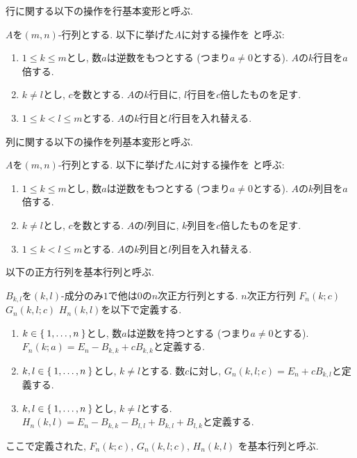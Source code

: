 行に関する以下の操作を行基本変形と呼ぶ.
\begin{definition}
  \label{def:mat:fundtransformation}
  $A$を$(m,n)$-行列とする.
  以下に挙げた$A$に対する操作を
  と呼ぶ:
  \begin{enumerate}
  \item $1\leq k \leq m$とし, 数$a$は逆数をもつとする (つまり$a\neq 0$とする).
    $A$の$k$行目を$a$倍する.
  \item $k\neq l$とし, $c$を数とする.
    $A$の$k$行目に, $l$行目を$c$倍したものを足す.
  \item $1\leq k<l \leq m$とする.
    $A$の$k$行目と$l$行目を入れ替える.
  \end{enumerate}
\end{definition}
列に関する以下の操作を列基本変形と呼ぶ.
\begin{definition}
  \label{def:mat:fundtransformation:col}
  $A$を$(m,n)$-行列とする.
  以下に挙げた$A$に対する操作を
  と呼ぶ:
  \begin{enumerate}
  \item $1\leq k \leq m$とし, 数$a$は逆数をもつとする (つまり$a\neq 0$とする).
    $A$の$k$列目を$a$倍する.
  \item $k\neq l$とし, $c$を数とする.
    $A$の$l$列目に, $k$列目を$c$倍したものを足す.
  \item $1\leq k<l \leq m$とする.
    $A$の$k$列目と$l$列目を入れ替える.
  \end{enumerate}
\end{definition}
以下の正方行列を基本行列と呼ぶ.
\begin{definition}
  $B_{k,l}$を$(k,l)$-成分のみ$1$で他は$0$の$n$次正方行列とする.
  $n$次正方行列
  $F_n(k;c)$
  $G_n(k,l;c)$
  $H_n(k,l)$を以下で定義する.
  \begin{enumerate}
  \item
    $k\in\Set{1,\ldots,n}$とし,
    数$a$は逆数を持つとする (つまり$a\neq 0$とする).
    $F_n(k;a)=E_n-B_{k,k}+cB_{k,k}$と定義する.
  \item
    $k,l\in\Set{1,\ldots,n}$とし,
    $k\neq l$とする.
    数$c$に対し,
    $G_n(k,l;c)=E_n+cB_{k,l}$と定義する.
  \item
    $k,l\in\Set{1,\ldots,n}$とし,
    $k\neq l$とする.
    $H_n(k,l)=E_n-B_{k,k}-B_{l,l}+B_{k,l}+B_{l,k}$と定義する.
  \end{enumerate}
  ここで定義された,
  $F_n(k;c)$, $G_n(k,l;c)$, $H_n(k,l)$
  を基本行列と呼ぶ.
\end{definition}
